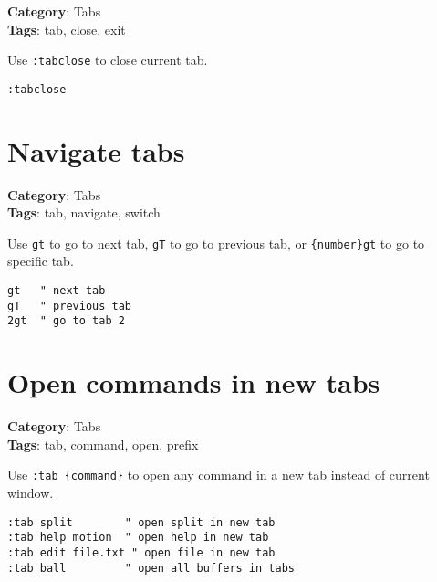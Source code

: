 {{{{{{{{{{{{{\textbf{Category}: Tabs\\ \textbf{Tags}: tab, close, exit
\vspace{0.5cm}

Use {\footnotesize \Verb§:tabclose§} to close current tab.

\begin{Exa*}{}
\begin{Verbatim}[fontsize=\footnotesize, breaklines, breakanywhere]
:tabclose
\end{Verbatim}
\end{Exa*}

\section{Navigate tabs}

\textbf{Category}: Tabs\\ \textbf{Tags}: tab, navigate, switch
\vspace{0.5cm}

Use {\footnotesize \Verb§gt§} to go to next tab, {\footnotesize \Verb§gT§} to go to previous tab, or {\footnotesize \Verb§{number}gt§} to go to specific tab.

\begin{Exa*}{}
\begin{Verbatim}[fontsize=\footnotesize, breaklines, breakanywhere]
gt   " next tab
gT   " previous tab
2gt  " go to tab 2
\end{Verbatim}
\end{Exa*}

\section{Open commands in new tabs}

\textbf{Category}: Tabs\\ \textbf{Tags}: tab, command, open, prefix
\vspace{0.5cm}

Use {\footnotesize \Verb§:tab {command}§} to open any command in a new tab instead of current window.

\begin{Exa*}{}
\begin{Verbatim}[fontsize=\footnotesize, breaklines, breakanywhere]
:tab split        " open split in new tab
:tab help motion  " open help in new tab
:tab edit file.txt " open file in new tab
:tab ball         " open all buffers in tabs
\end{Verbatim}
\end{Exa*}

}}}}}}}}}}}}}
